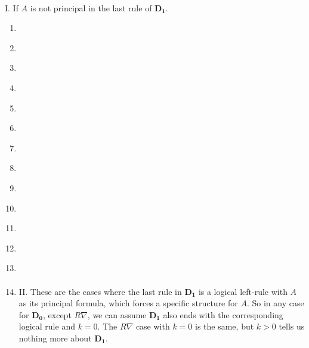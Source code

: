 \begin{enumerate}
	\paragraph{} I. If $A$ is not principal in the last rule of $\mathbf{D_1}$.
	
	\begin{enumerate}[label={\alph*.}]
		\item \label{c:*-lw} 
		
		\item \label{c:*-rw} 
		
		\item \label{c:*-lc} 

		\item \label{c:*-cut} 


		\item \label{c:*-la1} 
		
		\item \label{c:*-la2} 
		
		\item \label{c:*-ra} 
		
		\item \label{c:*-lo} 
		
		\item \label{c:*-ro1} 
		
		\item \label{c:*-ro2} 
		
		\item \label{c:*-li} 
		
		\item \label{c:*-ri} 
		
		\item \label{c:*-ln} 
		
		\item \label{c:*-rn} 
	
		\paragraph{} II. These are the cases where the last rule in $\mathbf{D_1}$ is a logical left-rule with $A$ as its principal formula, which forces a specific structure for $A$. So in any case for $\mathbf{D_0}$, except $R \nabla$, we can assume $\mathbf{D_1}$ also ends with the corresponding logical rule and $k = 0$. The $R \nabla$ case with $k = 0$ is the same, but $k > 0$ tells us nothing more about $\mathbf{D_1}$.


\end{enumerate}
\end{enumerate}
